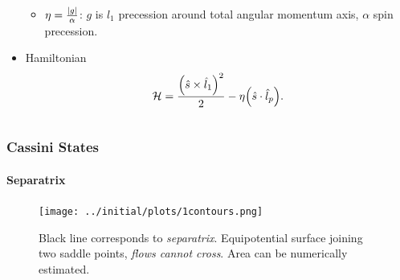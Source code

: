 \documentclass[dvipsnames]{beamer}
\DeclarePairedDelimiter\abs{\lvert}{\rvert}
\DeclarePairedDelimiter\p{\lparen}{\rparen}
\begin{document}
\begin{frame}
\begin{columns}
\begin{column}{0.45\textwidth}
\begin{itemize}
\begin{itemize}
                    \item $\eta = \frac{\abs*{g}}{\alpha}$: $g$ is $\hat{l}_1$
                        precession around total angular momentum axis, $\alpha$ spin
                        precession.
                \end{itemize}
                \item Hamiltonian
                    \begin{equation*}
                        \mathcal{H} = \frac{\p*{\hat{s} \times \hat{l}_1}^2}{2}
                            - \eta\p*{\hat{s} \cdot \hat{l}_p}.
                    \end{equation*}
            \end{itemize}
        \end{column}
    \end{columns}
\end{frame}

\begin{frame}
    \frametitle{Cassini States}
    \framesubtitle{Separatrix}

    \begin{figure}[t]
        \centering
        \texttt{[image: ../initial/plots/1contours.png]}
        \caption{Black line corresponds to \emph{separatrix}. Equipotential
        surface joining two saddle points, \emph{flows cannot cross}. Area can
        be numerically estimated.}
    \end{figure}
\end{frame}
\end{document}
